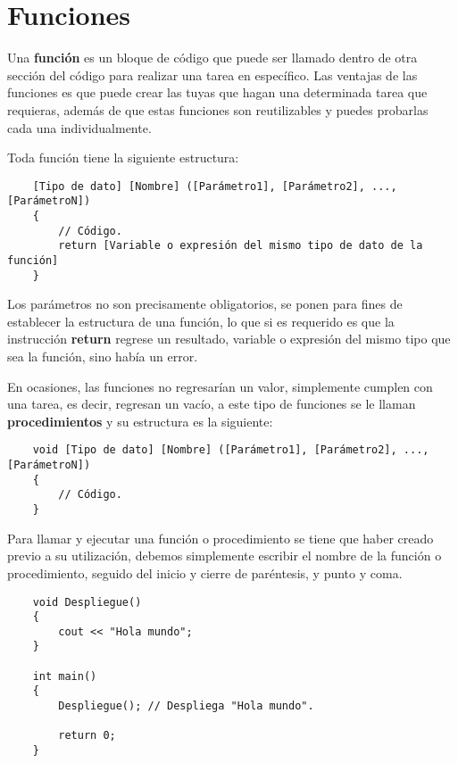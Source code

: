 \section{Funciones}

Una \textbf{función} es un bloque de código que puede ser llamado dentro de otra sección del código para realizar una tarea en específico. Las ventajas de las funciones es que puede crear las tuyas que hagan una determinada tarea que requieras, además de que estas funciones son reutilizables y puedes probarlas cada una individualmente.

Toda función tiene la siguiente estructura:
\begin{lstlisting}
    [Tipo de dato] [Nombre] ([Parámetro1], [Parámetro2], ..., [ParámetroN])
    {
        // Código.
        return [Variable o expresión del mismo tipo de dato de la función]
    }
\end{lstlisting}

Los parámetros no son precisamente obligatorios, se ponen para fines de establecer la estructura de una función, lo que si es requerido es que la instrucción \textbf{return} regrese un resultado, variable o expresión del mismo tipo que sea la función, sino había un error.

En ocasiones, las funciones no regresarían un valor, simplemente cumplen con una tarea, es decir, regresan un vacío, a este tipo de funciones se le llaman \textbf{procedimientos} y su estructura es la siguiente:
\begin{lstlisting}
    void [Tipo de dato] [Nombre] ([Parámetro1], [Parámetro2], ..., [ParámetroN])
    {
        // Código.
    }
\end{lstlisting}

Para llamar y ejecutar una función o procedimiento se tiene que haber creado previo a su utilización, debemos simplemente escribir el nombre de la función o procedimiento, seguido del inicio y cierre de paréntesis, y punto y coma.
\begin{lstlisting}
    void Despliegue()
    {
        cout << "Hola mundo";
    }
    
    int main()
    {
        Despliegue(); // Despliega "Hola mundo".
        
        return 0;
    }
\end{lstlisting}

